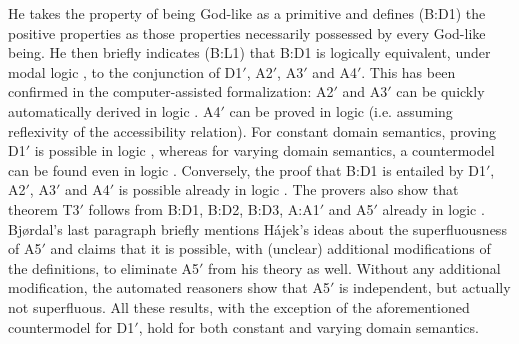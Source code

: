 \documentclass{birkjour}
\theoremstyle{definition}
\theoremstyle{remark}
\numberwithin{equation}{section}
\begin{document}
He takes the property of being God-like as a primitive and defines (B:D1) the positive properties as
those properties necessarily possessed by every God-like being. He
then briefly indicates (B:L1) that B:D1 is logically equivalent, under
modal logic \SFour, to the conjunction of D1$'$, A2$'$, A3$'$ and A4$'$. This
has been confirmed in the computer-assisted formalization: A2$'$ and A3$'$
can be quickly automatically derived in logic \K. A4$'$ can be proved in
logic \KT (i.e. assuming reflexivity of the accessibility relation).
For constant domain semantics, proving D1$'$ is possible in logic \KFour,
whereas for varying domain semantics, a countermodel can be found
even in logic \SFive. Conversely, the proof that B:D1 is entailed by
D1$'$, A2$'$, A3$'$ and A4$'$ is possible already in logic \K. The provers
also show that theorem T3$'$ follows from B:D1, B:D2, B:D3, A:A1$'$ and
A5$'$ already in logic \KB. Bjørdal's last paragraph briefly mentions
Hájek's ideas about the superfluousness of A5$'$ and claims that it is
possible, with (unclear) additional modifications of the definitions,
to eliminate A5$'$ from his theory as well. Without any additional
modification, the automated reasoners show that A5$'$ is independent, but actually
not superfluous. All these results, with the exception of the
aforementioned countermodel for D1$'$, hold for both constant and
varying domain semantics.

\def\tabred{red!50}
\def\tabgreen{green!50}
\def\tabyellow{yellow!50}
\def\tabbox#1#2{\colorbox{#1}{\begin{minipage}[c][1em]{3.3em}
      \centering #2 \end{minipage}}}
\def\tabboxs#1#2{\colorbox{#1}{\begin{minipage}[c][1em]{1.5em}
      \centering #2 \end{minipage}}}
\end{document}
